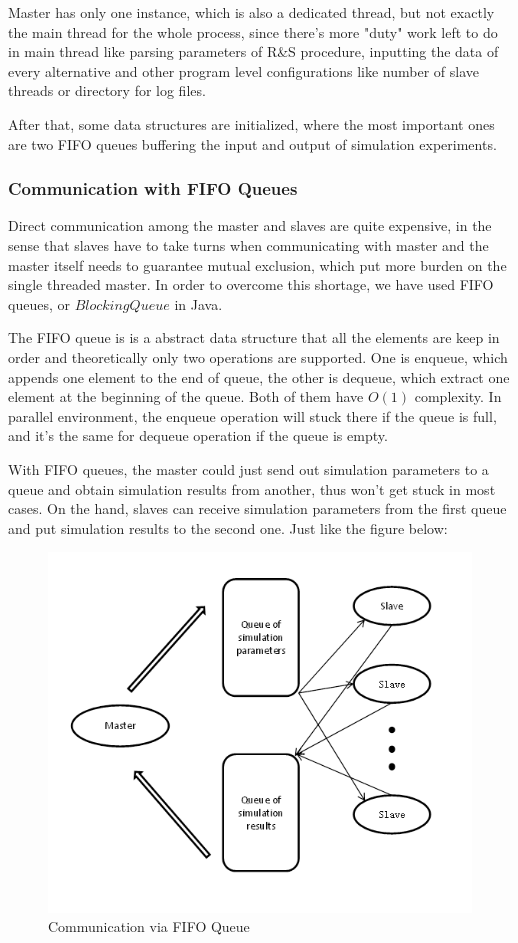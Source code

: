 Master has only one instance, which is also a dedicated thread, but not exactly the main thread for the whole process, since there's more "duty" work left to do in main thread like parsing parameters of R\&S procedure, inputting the data of every alternative and other program level configurations like number of slave threads or directory for log files.

After that, some data structures are initialized, where the most important ones are two FIFO queues buffering the input and output of simulation experiments.

\subsubsection{Communication with FIFO Queues}

Direct communication among the master and slaves are quite expensive, in the sense that slaves have to take turns when communicating with master and the master itself needs to guarantee mutual exclusion, which put more burden on the single threaded master. In order to overcome this shortage, we have used FIFO queues, or $BlockingQueue$ in Java.

The FIFO queue is is a abstract data structure that all the elements are keep in order and theoretically only two operations are supported. One is enqueue, which appends one element to the end of queue, the other is dequeue, which extract one element at the beginning of the queue. Both of them have $O(1)$ complexity. In parallel environment, the enqueue operation will stuck there if the queue is full, and it's the same for dequeue operation if the queue is empty.

With FIFO queues, the master could just send out simulation parameters to a queue and obtain simulation results from another, thus won't get stuck in most cases. On the hand, slaves can receive simulation parameters from the first queue and put simulation results to the second one. Just like the figure below:

\begin{figure}[ht]
\centering
\includegraphics[width=120mm]{master-slave-queue.png}
\caption{Communication via FIFO Queue}
\end{figure}


